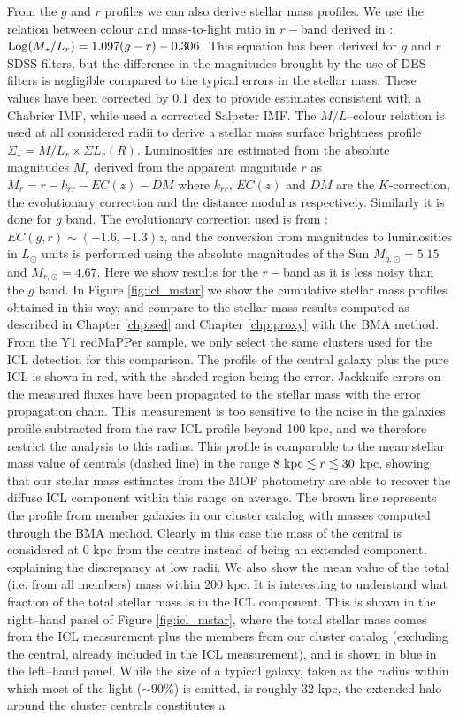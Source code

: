 {From the $g$ and $r$ profiles we can also derive stellar mass profiles. We use the relation between colour and mass-to-light ratio in $r-$band derived in \citet{bell}: ${\rm Log} (M_\star/L_r) = 1.097 (g - r) - 0.306$.  This equation has been derived for $g$ and $r$ SDSS filters, but the difference in the magnitudes brought by the use of DES filters is negligible compared to the typical errors in the stellar mass.  These values have been corrected by 0.1 dex to provide estimates consistent with a Chabrier IMF, while \citet{bell} used a corrected Salpeter IMF. The $M/L$--colour relation is used at all considered radii to derive a stellar mass surface brightness profile $\Sigma_\star=M/L_r \times \Sigma L_r(R)$. Luminosities are estimated from the absolute magnitudes $M_r$ derived from the apparent magnitude $r$ as $M_r = r - k_{rr} -EC(z) -DM$ where $k_{rr}$, $EC(z)$ and $DM$ are the $K$-correction, the evolutionary correction and the distance modulus respectively. Similarly it is done for $g$ band. The evolutionary correction used is from \citet{bell}: $EC(g, r) \sim (-1.6, -1.3)z$, and the conversion from magnitudes to luminosities in $L_\odot$ units is performed using the absolute magnitudes of the Sun $M_{g,\odot} = 5.15$ and $M_{r,\odot} = 4.67$. Here we show results for the $r-$band as it is less noisy than the $g$ band. In Figure \ref{fig:icl_mstar} we show the cumulative stellar mass profiles obtained in this way, and compare to the stellar mass results computed as described in Chapter \ref{chp:sed} and Chapter \ref{chp:proxy} with the BMA method. From the Y1 redMaPPer sample, we only select the same clusters used for the ICL detection for this comparison. The profile of the central galaxy plus the pure ICL is shown in red, with the shaded region being the error. Jackknife errors on the measured fluxes have been propagated to the stellar mass with the error propagation chain. This measurement is too sensitive to the noise in the galaxies profile subtracted from the raw ICL profile beyond 100 kpc, and we therefore restrict the analysis to this radius. This profile is comparable to the mean stellar mass value of centrals (dashed line) in the range $8~{\rm kpc} \lesssim r \lesssim 30$ kpc, showing that our stellar mass estimates from the MOF photometry are able to recover the diffuse ICL component within this range on average. The brown line represents the profile from member galaxies in our cluster catalog with masses computed through the BMA method. Clearly in this case the mass of the central is considered at 0 kpc from the centre instead of being an extended component, explaining the discrepancy at low radii. We also show the mean value of the total (i.e. from all members) mass within 200 kpc. It is interesting to understand what fraction of the total stellar mass is in the ICL component. This is shown in the right--hand panel of Figure \ref{fig:icl_mstar}, where the total stellar mass comes from the ICL measurement plus the members from our cluster catalog (excluding the central, already included in the ICL measurement), and is shown in blue in the left--hand panel. While the size of a typical galaxy, taken as the radius within which most of the light ($\sim 90\%$) is emitted, is roughly 32 kpc, the extended halo around the cluster centrals constitutes a }
